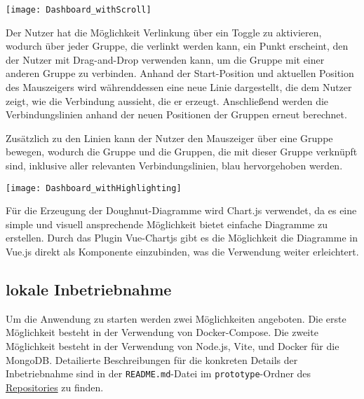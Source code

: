 \vspace{20pt}
\begin{center}
    \begin{minipage}{1\linewidth}
        \texttt{[image: Dashboard\_withScroll]}
    \end{minipage}
\end{center}
\vspace{20pt}

Der Nutzer hat die Möglichkeit Verlinkung über ein Toggle zu aktivieren, wodurch über jeder Gruppe, die verlinkt werden kann, ein Punkt erscheint, den der Nutzer mit Drag-and-Drop verwenden kann, um die Gruppe mit einer anderen Gruppe zu verbinden.
Anhand der Start-Position und aktuellen Position des Mauszeigers wird währenddessen eine neue Linie dargestellt, die dem Nutzer zeigt, wie die Verbindung aussieht, die er erzeugt. Anschließend werden die Verbindungslinien anhand der neuen Positionen der Gruppen erneut berechnet.

Zusätzlich zu den Linien kann der Nutzer den Mauszeiger über eine Gruppe bewegen, wodurch die Gruppe und die Gruppen, die mit dieser Gruppe verknüpft sind, inklusive aller relevanten Verbindungslinien, blau hervorgehoben werden.

\vspace{20pt}
\begin{center}
    \begin{minipage}{1\linewidth}
        \texttt{[image: Dashboard\_withHighlighting]}
    \end{minipage}
\end{center}
\vspace{20pt}

Für die Erzeugung der Doughnut-Diagramme wird Chart.js verwendet, da es eine simple und visuell ansprechende Möglichkeit bietet einfache Diagramme zu erstellen. Durch das Plugin Vue-Chartjs gibt es die Möglichkeit die Diagramme in Vue.js direkt als Komponente einzubinden, was die Verwendung weiter erleichtert.

\subsection{lokale Inbetriebnahme}
Um die Anwendung zu starten werden zwei Möglichkeiten angeboten. Die erste Möglichkeit besteht in der Verwendung von Docker-Compose. Die zweite Möglichkeit besteht in der Verwendung von Node.js, Vite, und Docker für die MongoDB.
Detailierte Beschreibungen für die konkreten Details der Inbetriebnahme sind in der \verb|README.md|-Datei im \verb|prototype|-Ordner des \href{https://github.com/Max-0e/bachelor/blob/main/prototype/README.md}{Repositories} zu finden.

